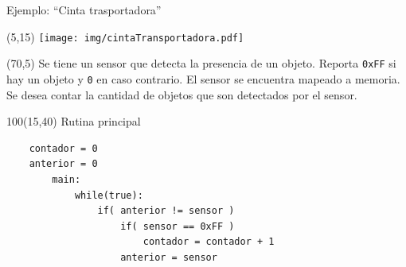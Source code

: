 \documentclass[aspectratio=169]{beamer}
\begin{document}
\begin{frame}[fragile,t]{Ejemplo: ``Cinta trasportadora''}
    \begin{textblock}{60}(5,15)
    \texttt{[image: img/cintaTransportadora.pdf]}\\
    \end{textblock}
    \begin{textblock}{80}(70,5)
    \small Se tiene un sensor que detecta la presencia de un objeto. Reporta \texttt{0xFF} si hay un objeto y \texttt{0} en caso contrario.
    El sensor se encuentra mapeado a memoria. Se desea contar la cantidad de objetos que son detectados por el sensor.
    \end{textblock}
    \begin{textblock}{100}(15,40)
    \textcolor{naranjauca}{Rutina principal}
    \small
    \vspace{-0.2cm}
    \begin{verbatim}
    contador = 0
    anterior = 0
        main:
            while(true):
                if( anterior != sensor )
                    if( sensor == 0xFF )
                        contador = contador + 1
                    anterior = sensor
    \end{verbatim}
    \end{textblock}
\end{frame}

\end{document}
